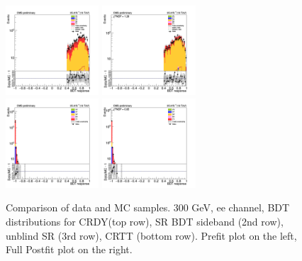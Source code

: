 \begin{figure}[tbp]
\begin{center}
    \includegraphics[width=0.31\textwidth]{figures/ee_300_SR_april21/bdt_response_afterCut_ee_SR_prefit_plot_apr21.png}                                                   
    \includegraphics[width=0.31\textwidth]{figures/ee_300_SR_april21/bdt_response_afterCut_ee_SR_FullPostfit_plot_apr21.png}\\                                            
    \includegraphics[width=0.31\textwidth]{figures/ee_300_april18/bdt_response_ee_CRTT_prefit_plot_apr18.png}                                                             
    \includegraphics[width=0.31\textwidth]{figures/ee_300_april18/bdt_response_ee_CRTT_FullPostfit_plot_apr18.png}\\                                                      
    \caption{Comparison of data and MC samples. 300 GeV, ee channel, BDT distributions for CRDY(top row), SR BDT sideband (2nd row), unblind SR (3rd row), CRTT (bottom row). Prefit plot on the left, Full Postfit plot on the right.}                       
    \label{fig:bdt_ee}                                                                                                                                                    
  \end{center}                                                                                                                                                            
\end{figure}                                                                                                                                                              


